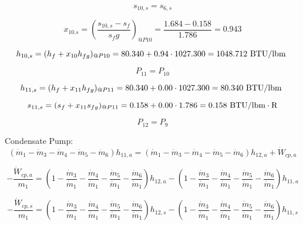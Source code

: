 \documentclass{article}
\begin{document}
\begin{equation}
s_{10,s} = s_{ 6,s}
\end{equation}

\begin{equation}
x_{10.s} = (\frac{s_{10,s} - s_{f}}{s_fg})_{@P10} = \frac{   1.684 -    0.158}{   1.786} =    0.943
\end{equation}

\begin{equation}
  h_{10,s} = (h_{f} + x_{10}h_{fg})_{@P10} =   80.340 + 0.94\cdot1027.300 = 1048.712
\textnormal{ BTU/lbm                   }
\end{equation}

\begin{equation}
P_{11} = P_{10}
\end{equation}

\begin{equation}
  h_{11,s} = (h_{f} + x_{11}h_{fg})_{@P11} =   80.340 + 0.00\cdot1027.300 =   80.340
\textnormal{ BTU/lbm                   }
\end{equation}

\begin{equation}
  s_{11,s} = (s_{f} + x_{11}s_{fg})_{@P11} =    0.158 + 0.00\cdot   1.786 =    0.158
\textnormal{ BTU/lbm}\cdot\textnormal{R}
\end{equation}

\begin{equation}
P_{12} = P_{ 9}
\end{equation}


Condensate Pump:
\begin{equation}
(\dot{m}_{ 1} - \dot{m}_{ 3} - \dot{m}_{ 4} - \dot{m}_{ 5} - \dot{m}_{ 6})h_{11,a} = (\dot{m}_{ 1} - \dot{m}_{ 3} - \dot{m}_{ 4} - \dot{m}_{ 5} - \dot{m}_{ 6})h_{12,a} + \dot{W}_{cp ,a}
\end{equation}

\begin{equation}
-\frac{\dot{W}_{cp ,a}}{m_1} = (1 - \frac{\dot{m}_{ 3}}{\dot{m}_{ 1}} - \frac{\dot{m}_{ 4}}{\dot{m}_{ 1}} - \frac{\dot{m}_{ 5}}{\dot{m}_{ 1}} - \frac{\dot{m}_{ 6}}{\dot{m}_{ 1}})h_{12,a} - (1 - \frac{\dot{m}_{ 3}}{\dot{m}_{ 1}} - \frac{\dot{m}_{ 4}}{\dot{m}_{ 1}} - \frac{\dot{m}_{ 5}}{\dot{m}_{ 1}} - \frac{\dot{m}_{ 6}}{\dot{m}_{ 1}})h_{11,a}\end{equation}

\begin{equation}
-\frac{\dot{W}_{cp ,s}}{m_1} = (1 - \frac{\dot{m}_{ 3}}{\dot{m}_{ 1}} - \frac{\dot{m}_{ 4}}{\dot{m}_{ 1}} - \frac{\dot{m}_{ 5}}{\dot{m}_{ 1}} - \frac{\dot{m}_{ 6}}{\dot{m}_{ 1}})h_{12,s} - (1 - \frac{\dot{m}_{ 3}}{\dot{m}_{ 1}} - \frac{\dot{m}_{ 4}}{\dot{m}_{ 1}} - \frac{\dot{m}_{ 5}}{\dot{m}_{ 1}} - \frac{\dot{m}_{ 6}}{\dot{m}_{ 1}})h_{11,s}\end{equation}
\end{document}
